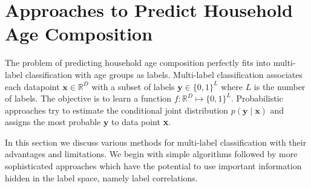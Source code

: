 \section{Approaches to Predict Household Age Composition}
\label{sec:approaches}
The problem of predicting household age composition perfectly fits into multi-label classification with age groups as labels.
Multi-label classification associates each datapoint ${\textbf{x} \in \mathbb{R}^{D}}$ with a subset of labels ${\textbf{y} \in \{0,1\}^{L} }$ where $L$ is the number of labels. The objective is to learn a function $\textit{f}:\mathbb{R}^{D} \mapsto \{0,1\}^{L}$. Probabilistic approaches try to estimate the conditional joint distribution $p(\textbf{y}\mid \textbf{x})$ and assigns the most probable $\textbf{y}$ to data point \textbf{x}. 

In this section we discuss various methods for multi-label classification with their advantages and limitations. We begin with simple algorithms followed by more sophisticated approaches which have the potential to use important information hidden in the label space, namely label correlations. 
%
